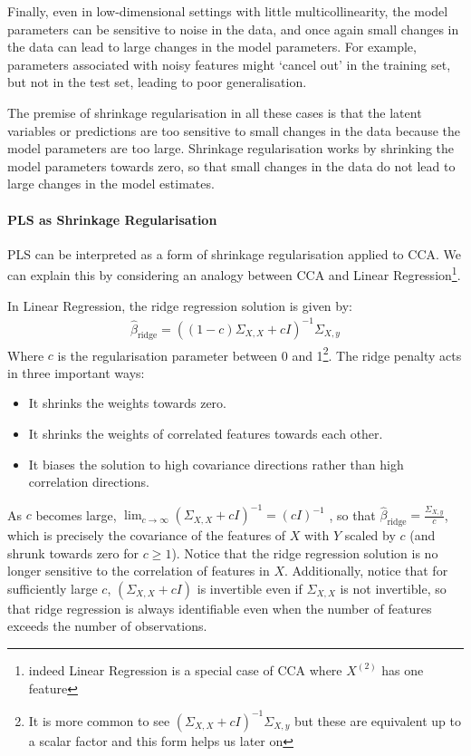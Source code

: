 Finally, even in low-dimensional settings with little multicollinearity, the model parameters can be sensitive to noise in the data, and once again small changes in the data can lead to large changes in the model parameters.
For example, parameters associated with noisy features might `cancel out' in the training set, but not in the test set, leading to poor generalisation.

The premise of shrinkage regularisation in all these cases is that the latent variables or predictions are too sensitive to small changes in the data because the model parameters are too large.
Shrinkage regularisation works by shrinking the model parameters towards zero, so that small changes in the data do not lead to large changes in the model estimates.

\paragraph{PLS as Shrinkage Regularisation} PLS can be interpreted as a form of shrinkage regularisation applied to CCA. We can explain this by considering an analogy between CCA and Linear Regression\footnote{indeed Linear Regression is a special case of CCA where \(X^{(2)}\) has one feature}.

In Linear Regression, the ridge regression solution is given by:
\begin{align}
    \hat{\beta}_{\text{ridge}} = ((1-c)\Sigma_{X,X} + c I)^{-1} \Sigma_{X,y}
\end{align}
Where \(c\) is the regularisation parameter between 0 and 1\footnote{It is more common to see $(\Sigma_{X,X} + c I)^{-1} \Sigma_{X,y}$ but these are equivalent up to a scalar factor and this form helps us later on}.
The ridge penalty acts in three important ways:
\begin{itemize}
    \item It shrinks the \gls{weights} towards zero.
    \item It shrinks the \gls{weights} of correlated features towards each other.
    \item It biases the solution to high covariance directions rather than high correlation directions.
\end{itemize}

As $c$ becomes large, $\lim_{c \to \infty} (\Sigma_{X,X} + c I)^{-1} = (c I)^{-1}$
, so that $\hat{\beta}_{\text{ridge}}=\frac{\Sigma_{X,y}}{c}$, which is precisely the covariance of the features of $X$ with $Y$ scaled by $c$ (and shrunk towards zero for $c \geq 1$).
Notice that the ridge regression solution is no longer sensitive to the correlation of features in $X$.
Additionally, notice that for sufficiently large $c$, $(\Sigma_{X,X} + c I)$ is invertible even if $\Sigma_{X,X}$ is not invertible, so that ridge regression is always identifiable even when the number of features exceeds the number of observations.

